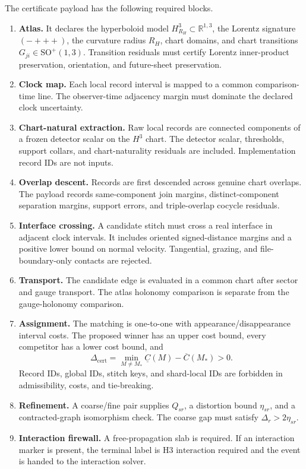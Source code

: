The certificate payload has the following required blocks.
\begin{enumerate}
\item \textbf{Atlas.} It declares the hyperboloid model \(H^3_{R_H}\subset\mathbb R^{1,3}\),
the Lorentz signature \((-+++)\), the curvature radius \(R_H\), chart domains, and chart
transitions \(G_{ji}\in\mathrm{SO}^{+}(1,3)\). Transition residuals must certify Lorentz
inner-product preservation, orientation, and future-sheet preservation.
\item \textbf{Clock map.} Each local record interval is mapped to a common comparison-time line.
The observer-time adjacency margin must dominate the declared clock uncertainty.
\item \textbf{Chart-natural extraction.} Raw local records are connected components of a frozen
detector scalar on the \(H^3\) chart. The detector scalar, thresholds, support collars, and
chart-naturality residuals are included. Implementation record IDs are not inputs.
\item \textbf{Overlap descent.} Records are first descended across genuine chart overlaps. The
payload records same-component join margins, distinct-component separation margins, support
errors, and triple-overlap cocycle residuals.
\item \textbf{Interface crossing.} A candidate stitch must cross a real interface in adjacent
clock intervals. It includes oriented signed-distance margins and a positive lower bound on
normal velocity. Tangential, grazing, and file-boundary-only contacts are rejected.
\item \textbf{Transport.} The candidate edge is evaluated in a common chart after sector and
gauge transport. The atlas holonomy comparison is separate from the gauge-holonomy comparison.
\item \textbf{Assignment.} The matching is one-to-one with appearance/disappearance interval
costs. The proposed winner has an upper cost bound, every competitor has a lower cost bound, and
\[
\Delta_{\mathrm{cert}}
=\min_{M\ne M_*}\underline C(M)-\overline C(M_*)>0 .
\]
Record IDs, global IDs, stitch keys, and shard-local IDs are forbidden in admissibility, costs,
and tie-breaking.
\item \textbf{Refinement.} A coarse/fine pair supplies \(Q_{sr}\), a distortion bound
\(\eta_{sr}\), and a contracted-graph isomorphism check. The coarse gap must satisfy
\(\Delta_r>2\eta_{sr}\).
\item \textbf{Interaction firewall.} A free-propagation slab is required. If an interaction marker
is present, the terminal label is \(\text{H3 interaction required}\) and the event is handed
to the interaction solver.
\end{enumerate}

